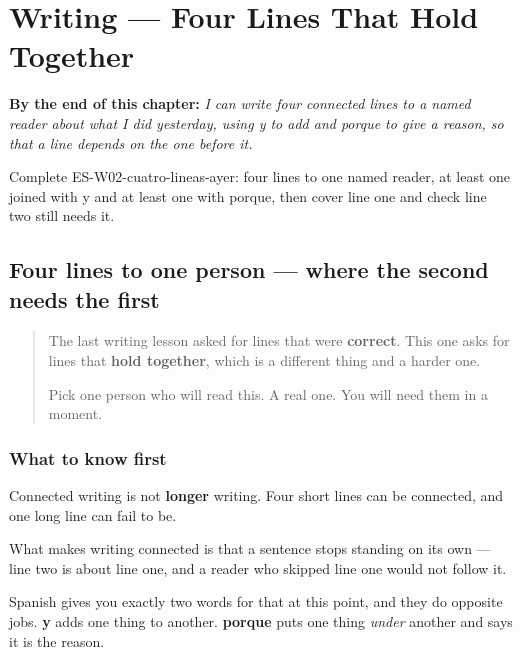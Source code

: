
\chapter{Writing --- Four Lines That Hold Together}
\label{ch:escribir-cuatro-lineas}

\begin{chapteropening}
\textbf{By the end of this chapter:} \emph{I can write four connected lines to a named reader about what I did yesterday, using y to add and porque to give a reason, so that a line depends on the one before it.}

Complete ES-W02-cuatro-lineas-ayer: four lines to one named reader, at least one joined with y and at least one with porque, then cover line one and check line two still needs it.
\end{chapteropening}

\section[ayer]{Four lines to one person — where the second needs the first}

\label{lesson:ES-W02-cuatro-lineas-ayer}



\begin{quote}
The last writing lesson asked for lines that were \textbf{correct}. This one asks for lines that \textbf{hold together}, which is a different thing and a harder one.

Pick one person who will read this. A real one. You will need them in a moment.
\end{quote}

\subsection*{What to know first}
Connected writing is not \textbf{longer} writing. Four short lines can be connected, and one long line can fail to be.

What makes writing connected is that a sentence stops standing on its own — line two is about line one, and a reader who skipped line one would not follow it.

Spanish gives you exactly two words for that at this point, and they do opposite jobs. \textbf{y} adds one thing to another. \textbf{porque} puts one thing \emph{under} another and says it is the reason.

